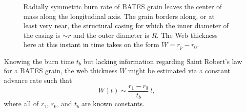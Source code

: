 \documentclass[11pt,dvipsnames]{thesis}
\begin{document}
\begin{figure}[H]
\caption{Radially symmetric burn rate of BATES grain leaves the center of mass along the longitudinal axis. The grain borders along, or at least very near, the structural casing for which the inner diameter of the casing is $\sim r$ and the outer diameter is $R$. The Web thickness here at this instant in time takes on the form $W = r_p - r_0$.}
\end{figure}
\noindent

Knowing the burn time $t_b$ but lacking information regarding Saint Robert's law for a BATES grain, the web thickness $W$ might be estimated via a constant advance rate such that
\begin{equation}
W(t) \sim \frac{r_1 - r_0}{t_b} \,t, \label{eq:PropulsionLinearizedWebThickness}
\end{equation}
where all of $r_1$, $r_0$, and $t_b$ are known constants.
\end{document}

